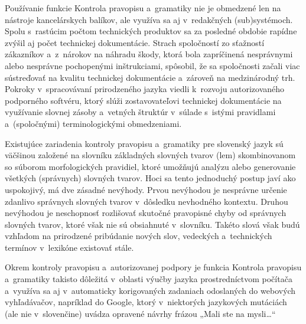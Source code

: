 Používanie funkcie Kontrola pravopisu a~gramatiky nie je obmedzené len na nástroje kancelárskych balíkov, ale využíva sa aj v~redakčných (sub)systémoch. Spolu s~rastúcim počtom technických produktov sa za posledné obdobie rapídne zvýšil aj počet technickej dokumentácie. Strach spoločností zo sťažností zákazníkov a~z~nárokov na náhradu škody, ktorá bola zapríčinená nesprávnymi alebo nesprávne pochopenými inštrukciami, spôsobil, že sa spoločnosti začali viac sústreďovať na kvalitu technickej dokumentácie a~zároveň na medzinárodný trh. Pokroky v~spracovávaní prirodzeného jazyka viedli k~rozvoju autorizovaného podporného softvéru, ktorý slúži zostavovateľovi technickej dokumentácie na využívanie slovnej zásoby a~vetných štruktúr v~súlade s~istými pravidlami a~(spoločnými) terminologickými obmedzeniami.

Existujúce zariadenia kontroly pravopisu a~gramatiky pre slovenský jazyk sú väčšinou založené na slovníku základných slovných tvarov (lem) skombinovanom so súborom morfologických pravidiel, ktoré umožňujú analýzu alebo generovanie všetkých (správnych) slovných tvarov. Hoci sa tento jednoduchý postup javí ako uspokojivý, má dve zásadné nevýhody. Prvou nevýhodou je nesprávne určenie zdanlivo správnych slovných tvarov v~dôsledku nevhodného kontextu. Druhou nevýhodou je neschopnosť rozlišovať skutočné pravopisné chyby od správnych slovných tvarov, ktoré však nie sú obsiahnuté v~slovníku. Takéto slová však budú vzhľadom na prirodzené pribúdanie nových slov, vedeckých a~technických termínov v~lexikóne existovať stále.

Okrem kontroly pravopisu a~autorizovanej podpory je funkcia Kontrola pravopisu a~gramatiky takisto dôležitá v~oblasti výučby jazyka prostredníctvom počítača a~využíva sa aj v~automaticky korigovaných zadaniach odoslaných do webových vyhľadávačov, napríklad do Google, ktorý v~niektorých jazykových mutáciách (ale nie v~slovenčine) uvádza opravené návrhy frázou „Mali ste na mysli\dots“
